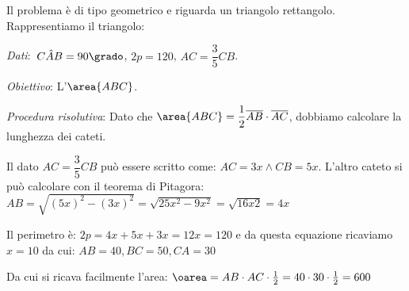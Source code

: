 \begin{soluzione}
 Il problema è di tipo geometrico e riguarda un triangolo rettangolo.
Rappresentiamo il triangolo:

\begin{htmulticols}{2}

\emph{Dati}:~\(C\hat{{A}}B=90\grado\), \(2p= 120\), \(AC=\dfrac{3}{5}CB\).

\emph{Obiettivo}: L'\(\area{ABC}\).

\begin{center}
 
\end{center}
\end{htmulticols}

\emph{Procedura risolutiva}:
Dato che \(\area{ABC} =\dfrac{1}{2}\overline{AB}\cdot \overline{AC}\),
dobbiamo calcolare la lunghezza dei cateti.

Il dato \(AC=\dfrac{3}{5}CB\) può essere scritto come: \(AC=3x \wedge CB=5x\).
L'altro cateto si può calcolare con il teorema di Pitagora:
\(AB=\sqrt{(5x)^2-(3x)^2}=\sqrt{25x^2-9x^2}=\sqrt{16x2}=4x\)

Il perimetro è: \(2p=4x+5x+3x=12x=120\) e da questa equazione ricaviamo 
\(x=10\) da cui: \(AB=40, BC=50, CA=30\)

Da cui si ricava facilmente l'area: 
\(\oarea = AB \cdot AC \cdot \frac{1}{2} = 
  40 \cdot 30 \cdot \frac{1}{2} = 600\)
\end{soluzione}

